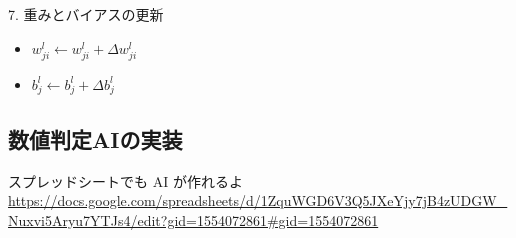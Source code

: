 \documentclass[dvipdfmx,aspectratio=169]{beamer}
\begin{document}
	\begin{frame}{7. 重みとバイアスの更新}
		\begin{itemize}
			\item $ w^l_{ji} \longleftarrow w^l_{ji} + \Delta w^l_{ji} $
			\item $ b^l_j \longleftarrow b^l_j + \Delta b^l_j $
		\end{itemize}
	\end{frame}
	\subsection{数値判定AIの実装}
	\begin{frame}{スプレッドシートでも AI が作れるよ}
		\url{https://docs.google.com/spreadsheets/d/1ZquWGD6V3Q5JXeYjy7jB4zUDGW_Nuxvi5Aryu7YTJs4/edit?gid=1554072861\#gid=1554072861}
	\end{frame}
\end{document}
